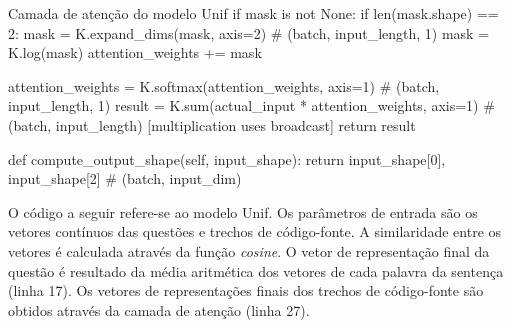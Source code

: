 \begin{mypython-linenumber}{Camada de atenção do modelo Unif}
        if mask is not None:
            if len(mask.shape) == 2:
                mask = K.expand_dims(mask, axis=2)  # (batch, input_length, 1)
            mask = K.log(mask)
            attention_weights += mask

        attention_weights = K.softmax(attention_weights, axis=1)  # (batch, input_length, 1)
        result = K.sum(actual_input * attention_weights, axis=1)  # (batch, input_length)  [multiplication uses broadcast]
        return result

    def compute_output_shape(self, input_shape):
        return input_shape[0], input_shape[2] # (batch, input_dim)
\end{mypython-linenumber}


\vspace{2cm}

O código a seguir refere-se ao modelo Unif. Os parâmetros de entrada são os vetores contínuos das questões e trechos de código-fonte. A similaridade entre os vetores é calculada através da função \textit{cosine}. O vetor de representação final da questão é resultado da média aritmética dos vetores de cada palavra da sentença (linha 17). Os vetores de representações finais dos trechos de código-fonte são obtidos através da camada de atenção (linha 27).


